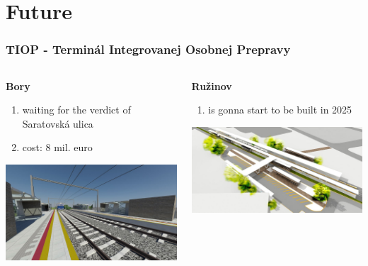 \section{Future}

\begin{frame}
	\frametitle{TIOP - Terminál Integrovanej Osobnej Prepravy}
	\footnotesize
	\begin{columns}
		\begin{column}{.32\textwidth}
			\textbf{Bory}\\
			\begin{enumerate}
				\item waiting for the verdict of Saratovská ulica
				\item cost: 8 mil. euro
			\end{enumerate}
			\vspace{1em}
			\includegraphics[width=\textwidth]{images/tiop-bory}
		\end{column}
		\begin{column}{.32\textwidth}
			\textbf{Ružinov}\\
			\begin{enumerate}
				\item is gonna start to be built in 2025
			\end{enumerate}
			\vspace{1em}
			\includegraphics[width=\textwidth]{images/tiop-ruzinov}

\end{column}
\end{columns}
\end{frame}
